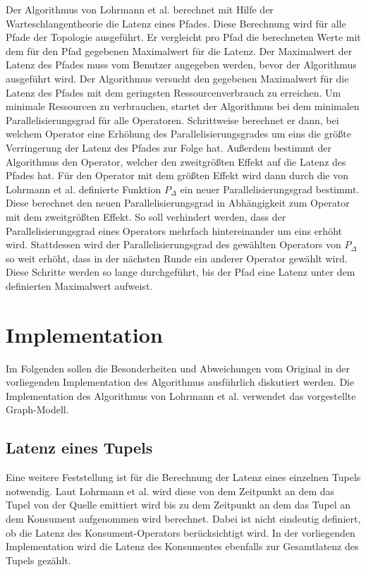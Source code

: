 Der Algorithmus von Lohrmann et al. berechnet mit Hilfe der Warteschlangentheorie die Latenz eines Pfades.
Diese Berechnung wird für alle Pfade der Topologie ausgeführt.
Er vergleicht pro Pfad die berechneten Werte mit dem für den Pfad gegebenen Maximalwert für die Latenz.
Der Maximalwert der Latenz des Pfades muss vom Benutzer angegeben werden, bevor der Algorithmus ausgeführt wird.
Der Algorithmus versucht den gegebenen Maximalwert für die Latenz des Pfades mit dem geringsten Ressourcenverbrauch zu erreichen.
Um minimale Ressourcen zu verbrauchen, startet der Algorithmus bei dem minimalen Parallelisierungsgrad für alle Operatoren.
Schrittweise berechnet er dann, bei welchem Operator eine Erhöhung des Parallelisierungsgrades um eins die größte Verringerung der Latenz des Pfades zur Folge hat.
Außerdem bestimmt der Algorithmus den Operator, welcher den zweitgrößten Effekt auf die Latenz des Pfades hat.
Für den Operator mit dem größten Effekt wird dann durch die von Lohrmann et al. definierte Funktion \(P_\Delta\) ein neuer Parallelisierungsgrad bestimmt.
Diese berechnet den neuen Parallelisierungsgrad in Abhängigkeit zum Operator mit dem zweitgrößten Effekt.
So soll verhindert werden, dass der Parallelisierungsgrad eines Operators mehrfach hintereinander um eins erhöht wird.
Stattdessen wird der Parallelisierungsgrad des gewählten Operators von \(P_\Delta\) so weit erhöht, dass in der nächsten Runde ein anderer Operator gewählt wird.
Diese Schritte werden so lange durchgeführt, bis der Pfad eine Latenz unter dem definierten Maximalwert aufweist.

\section{Implementation}

Im Folgenden sollen die Besonderheiten und Abweichungen vom Original in der vorliegenden Implementation des Algorithmus ausführlich diskutiert werden.
Die Implementation des Algorithmus von Lohrmann et al. verwendet das vorgestellte Graph-Modell.

\subsection{Latenz eines Tupels}
Eine weitere Feststellung ist für die Berechnung der Latenz eines einzelnen Tupels notwendig.
Laut Lohrmann et al. wird diese von dem Zeitpunkt an dem das Tupel von der Quelle emittiert wird bis zu dem Zeitpunkt an dem das Tupel an dem Konsument aufgenommen wird berechnet. 
Dabei ist nicht eindeutig definiert, ob die Latenz des Konsument-Operators berücksichtigt wird. 
In der vorliegenden Implementation wird die Latenz des Konsumentes ebenfalls zur Gesamtlatenz des Tupels gezählt.

